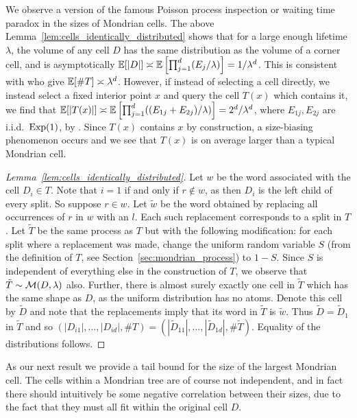 We observe a version of the famous Poisson process inspection or waiting time
paradox in the sizes of Mondrian cells. The above
Lemma~\ref{lem:cells_identically_distributed} shows that for a large enough
lifetime $\lambda$, the volume of any cell $D$ has the same distribution as the
volume of a corner cell, and is asymptotically
$\mathbb{E}[|D|] \asymp \mathbb{E} \left[ \prod_{j=1}^{d} (E_j / \lambda) \right]
= 1/\lambda^d$.
This is consistent with \citet[Proposition~2]{mourtada2020minimax} who give
$\mathbb{E}[\# T] \asymp \lambda^d$.
However, if instead of selecting a cell directly,
we instead select a fixed interior point $x$
and query the cell $T(x)$ which contains it, we find that
$\mathbb{E}[|T(x)|] \asymp \mathbb{E} \left[
\prod_{j=1}^{d} ((E_{1j} + E_{2j}) / \lambda) \right]
= 2^d/\lambda^d$, where $E_{1j}, E_{2j}$ are i.i.d.\ $\operatorname{Exp}(1)$,
by \citet[Proposition~1]{mourtada2020minimax}.
Since $T(x)$ contains $x$ by construction, a size-biasing phenomenon occurs
and we see that $T(x)$ is on average larger than a typical Mondrian cell.

\begin{proof}[Lemma~\ref{lem:cells_identically_distributed}]

  Let $w$ be the word associated with the cell $D_i \in T$.
  Note that $i=1$ if and only if $r \notin w$, as then $D_i$ is the left child
  of every split.
  So suppose $r \in w$.
  Let $\tilde w$ be the word obtained by replacing all occurrences
  of $r$ in $w$ with an $l$.
  Each such replacement corresponds to a split in $T$.
  Let $\tilde T$ be the same process as $T$ but with the following
  modification: for each split where a replacement was made,
  change the uniform random variable $S$
  (from the definition of $T$, see Section~\ref{sec:mondrian_process}) to $1-S$.
  Since $S$ is independent of everything else in the construction of $T$,
  we observe that $\tilde T \sim \mathcal{M}(D, \lambda)$ also.
  Further, there is almost surely exactly one cell in $\tilde T$
  which has the same shape as $D$, as the uniform distribution has no atoms.
  Denote this cell by $\tilde D$ and note that
  the replacements imply that its word in $\tilde T$
  is $\tilde w$.
  Thus $\tilde D = \tilde D_1$ in $\tilde T$ and so
  $(|D_{i1}|, \ldots, |D_{i d}|, \# T)
  = (|\tilde D_{11}|, \ldots, |\tilde D_{1d}|, \# \tilde T)$.
  Equality of the distributions follows.
\end{proof}

As our next result we provide a tail bound for the size of the largest
Mondrian cell. The cells within a Mondrian tree are of course not independent,
and in fact there should intuitively be some negative correlation between their
sizes, due to the fact that they must all fit within the original cell $D$.

